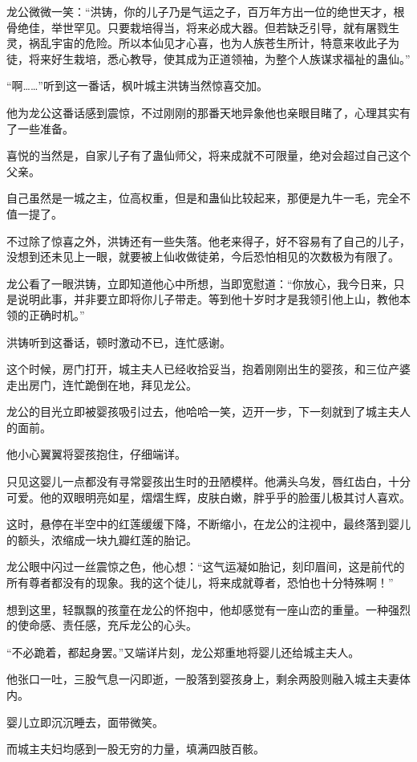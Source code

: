 \begin{this_body}
龙公微微一笑：“洪铸，你的儿子乃是气运之子，百万年方出一位的绝世天才，根骨绝佳，举世罕见。只要栽培得当，将来必成大器。但若缺乏引导，就有屠戮生灵，祸乱宇宙的危险。所以本仙见才心喜，也为人族苍生所计，特意来收此子为徒，将来好生栽培，悉心教导，使其成为正道领袖，为整个人族谋求福祉的蛊仙。”

“啊……”听到这一番话，枫叶城主洪铸当然惊喜交加。

他为龙公这番话感到震惊，不过刚刚的那番天地异象他也亲眼目睹了，心理其实有了一些准备。

喜悦的当然是，自家儿子有了蛊仙师父，将来成就不可限量，绝对会超过自己这个父亲。

自己虽然是一城之主，位高权重，但是和蛊仙比较起来，那便是九牛一毛，完全不值一提了。

不过除了惊喜之外，洪铸还有一些失落。他老来得子，好不容易有了自己的儿子，没想到还未见上一眼，就要被上仙收做徒弟，今后恐怕相见的次数极为有限了。

龙公看了一眼洪铸，立即知道他心中所想，当即宽慰道：“你放心，我今日来，只是说明此事，并非要立即将你儿子带走。等到他十岁时才是我领引他上山，教他本领的正确时机。”

洪铸听到这番话，顿时激动不已，连忙感谢。

这个时候，房门打开，城主夫人已经收拾妥当，抱着刚刚出生的婴孩，和三位产婆走出房门，连忙跪倒在地，拜见龙公。

龙公的目光立即被婴孩吸引过去，他哈哈一笑，迈开一步，下一刻就到了城主夫人的面前。

他小心翼翼将婴孩抱住，仔细端详。

只见这婴儿一点都没有寻常婴孩出生时的丑陋模样。他满头乌发，唇红齿白，十分可爱。他的双眼明亮如星，熠熠生辉，皮肤白嫩，胖乎乎的脸蛋儿极其讨人喜欢。

这时，悬停在半空中的红莲缓缓下降，不断缩小，在龙公的注视中，最终落到婴儿的额头，浓缩成一块九瓣红莲的胎记。

龙公眼中闪过一丝震惊之色，他心想：“这气运凝如胎记，刻印眉间，这是前代的所有尊者都没有的现象。我的这个徒儿，将来成就尊者，恐怕也十分特殊啊！”

想到这里，轻飘飘的孩童在龙公的怀抱中，他却感觉有一座山峦的重量。一种强烈的使命感、责任感，充斥龙公的心头。

“不必跪着，都起身罢。”又端详片刻，龙公郑重地将婴儿还给城主夫人。

他张口一吐，三股气息一闪即逝，一股落到婴孩身上，剩余两股则融入城主夫妻体内。

婴儿立即沉沉睡去，面带微笑。

而城主夫妇均感到一股无穷的力量，填满四肢百骸。


\end{this_body}
